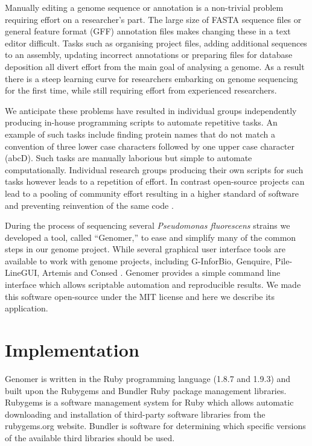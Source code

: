 \documentclass[10pt]{article}
\begin{document}
Manually editing a genome sequence or annotation is a non-trivial problem
requiring effort on a researcher's part. The large size of FASTA sequence files
or general feature format (GFF) annotation files makes changing these in a text
editor difficult. Tasks such as organising project files, adding additional
sequences to an assembly, updating incorrect annotations or preparing files for
database deposition all divert effort from the main goal of analysing a genome.
As a result there is a steep learning curve for researchers embarking on genome
sequencing for the first time, while still requiring effort from experienced
researchers.

We anticipate these problems have resulted in individual groups independently
producing in-house programming scripts to automate repetitive tasks. An example
of such tasks include finding protein names that do not match a convention of
three lower case characters followed by one upper case character (abcD). Such
tasks are manually laborious but simple to automate computationally. Individual
research groups producing their own scripts for such tasks however leads to a
repetition of effort. In contrast open-source projects can lead to a pooling of
community effort resulting in a higher standard of software and preventing
reinvention of the same code \cite{ince2012}.

During the process of sequencing several \emph{Pseudomonas fluorescens} strains
we developed a tool, called ``Genomer,'' to ease and simplify many of the
common steps in our genome project. While several graphical user interface
tools are available to work with genome projects, including G-InforBio,
Genquire, Pile-LineGUI, Artemis and Consed \cite{tanaka2006, wilkinson2002,
lopez2011, carver2012, gordon1998}. Genomer provides a simple command line
interface which allows scriptable automation and reproducible results. We made
this software open-source under the MIT license and here we describe its
application.

\section*{Implementation}

Genomer is written in the Ruby programming language (1.8.7 and 1.9.3)
\cite{ruby-lang,goto2010} and built upon the Rubygems and Bundler Ruby package
management libraries. Rubygems is a software management system for Ruby which
allows automatic downloading and installation of third-party software libraries
from the rubygems.org website. Bundler is software for determining which
specific versions of the available third libraries should be used.
\end{document}

